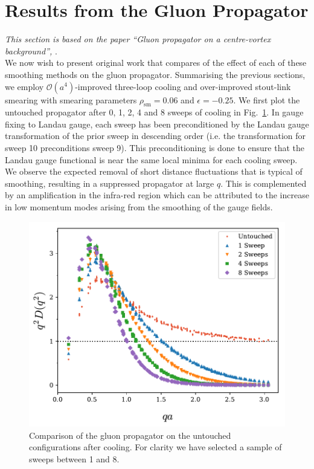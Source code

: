 \section{Results from the Gluon Propagator}\label{sec:CoolingGluProp}
\textit{This section is based on the paper ``Gluon propagator on a centre-vortex background'', }\citet{Biddle:2018dtc}.\\

We now wish to present original work that compares of the effect of each of these smoothing methods on the gluon propagator. Summarising the previous sections, we employ $\mathcal{O}(a^4)$-improved three-loop cooling and over-improved stout-link smearing with smearing parameters $\rho_\text{sm}=0.06$ and $\epsilon=-0.25$. We first plot the untouched propagator after 0, 1, 2, 4 and 8 sweeps of cooling in Fig.~\ref{fig:1to10SweepsCooling}. In gauge fixing to Landau gauge, each sweep has been preconditioned by the Landau gauge transformation of the prior sweep in descending order (i.e. the transformation for sweep 10 preconditions sweep 9). This preconditioning is done to ensure that the Landau gauge functional is near the same local minima for each cooling sweep. We observe the expected removal of short distance fluctuations that is typical of smoothing, resulting in a suppressed propagator at large $q$. This is complemented by an amplification in the infra-red region which can be attributed to the increase in low momentum modes arising from the smoothing of the gauge fields.\\
%
\begin{figure}[tb]
\centering
\includegraphics[width=\linewidth]{./ScalarGluComp_q2_1to10sweeps.pdf}
\caption[Comparison of the gluon propagator on the untouched configurations after cooling.]{\label{fig:1to10SweepsCooling}Comparison of the gluon propagator on the untouched configurations after cooling. For clarity we have selected a sample of sweeps between 1 and 8.}
\end{figure}
%


